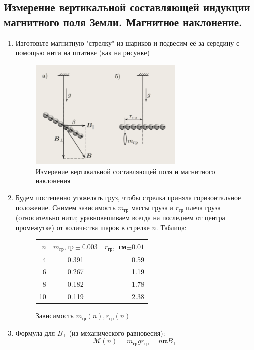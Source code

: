 \documentclass[12pt,a4paper]{article}
\newcommand{\mk}{\mathfrak}
\begin{document}
\newpage
\subsection{Измерение вертикальной составляющей индукции магнитного поля
Земли. Магнитное наклонение.}
\begin{enumerate}
  \item Изготовьте магнитную "стрелку" из шариков и подвесим её за середину с помощью нити на штативе  (как на рисунке)
  \begin{figure}[H]
    \includegraphics*[width=0.7\textwidth]{2023-10-02-17-36-48.png}
    \caption{Измерение вертикальной составляющей поля и магнитного наклонения}
  \end{figure}
  \item Будем постепенно утяжелять груз, чтобы стрелка приняла горизонтальное положение. Снимем зависимость $m_\text{гр}$ массы груза и $r_\text{гр}$ плеча груза (относительно нити; уравновешиваем всегда на последнем от центра промежутке) от количества шаров в стрелке $n$. Таблица:
  \begin{figure}[H]
    \begin{tabular}{|r|c|r|}
       $n$ & $m_\text{гр}, \text{гр} \pm 0.003$ &$r_\text{гр},$ см$\pm 0.01$\\
      \midrule
       4 & 0.391 & 0.59\\
       6 & 0.267 & 1.19\\
       8 & 0.182 & 1.78\\
      10 & 0.119 & 2.38\\
    \end{tabular}
    \caption{Зависимость $m_\text{гр}(n), r_\text{гр}(n)$}      
  \end{figure}
  \item Формула для $B_\bot$ \scriptsize(из механического равновесия)\normalsize:
  $$\mathcal{M}(n) = m_\text{гр}gr_\text{гр} = n \mk m B_\bot$$

\end{enumerate}
\end{document}
